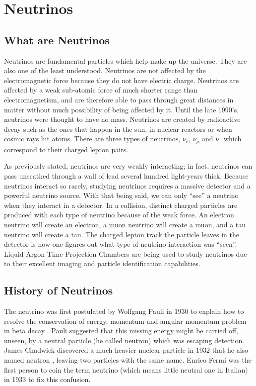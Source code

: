 \chapter{Neutrinos}\label{ch:neutrinos}

\section{What are Neutrinos}
Neutrinos are fundamental particles which help make up the universe. They are also one of the least understood. Neutrinos are not affected by the electromagnetic force because they do not have electric charge. Neutrinos are affected by a weak sub-atomic force of much shorter range than electromagnetism, and are therefore able to pass through great distances in matter without much possibility of being affected by it. Until the late 1990's, neutrinos were thought to have no mass. Neutrinos are created by radioactive decay such as the ones that happen in the sun, in nuclear reactors or when cosmic rays hit atoms. There are three types of neutrinos, $\nu_{e}$, $\nu_{\mu}$ and $\nu_{\tau}$ which correspond to their charged lepton pairs.  

As previously stated, neutrinos are very weakly interacting; in fact, neutrinos can pass unscathed through a wall of lead several hundred light-years thick. Because neutrinos interact so rarely, studying neutrinos requires a massive detector and a powerful neutrino source. With that being said, we can only ``see'' a neutrino when they interact in a detector. In a collision, distinct charged particles are produced with each type of neutrino because of the weak force. An electron neutrino will create an electron, a muon neutrino will create a muon, and a tau neutrino will create a tau. The charged lepton track the particle leaves in the detector is how one figures out what type of neutrino interaction was ``seen''. Liquid Argon Time Projection Chambers are being used to study neutrinos due to their excellent imaging and particle identification capabilities. 

\section{History of Neutrinos}
The neutrino was first postulated by Wolfgang Pauli in 1930 to explain how to resolve the conservation of energy, momentum and angular momentum problem in beta decay \cite{pauli}. Pauli suggested that this missing energy might be carried off, unseen, by a neutral particle (he called neutron) which was escaping detection. James Chadwick discovered a much heavier nuclear particle in 1932 that he also named neutron \cite{chadwick}, leaving two particles with the same name. Enrico Fermi was the first person to coin the term neutrino (which means little neutral one in Italian) in 1933 to fix this confusion. 

